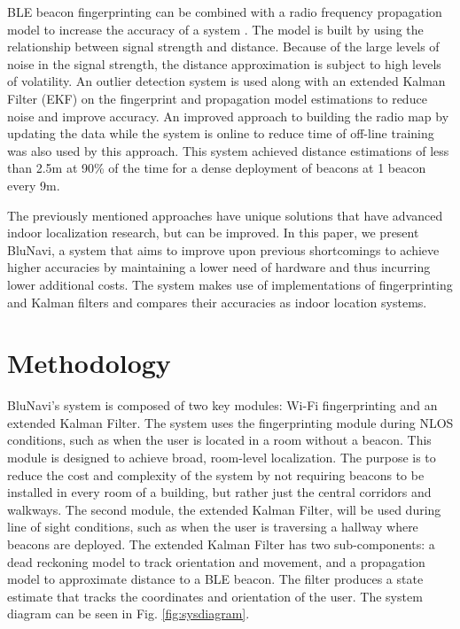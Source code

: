 \documentclass[conference]{IEEEtran}
\begin{document}
BLE beacon fingerprinting can be combined with a radio frequency propagation model to increase the accuracy of a system \cite{zhuang2016smartphone}. The model is built by using the relationship between signal strength and distance. Because of the large levels of noise in the signal strength, the distance approximation is subject to high levels of volatility.  An outlier detection system is used along with an extended Kalman Filter (EKF) on the fingerprint and propagation model estimations to reduce noise and improve accuracy. An improved approach to building the radio map by updating the data while the system is online to reduce time of off-line training was also used by this approach. This system achieved distance estimations of less than 2.5m at 90\% of the time for a dense deployment of beacons at 1 beacon every 9m.

The previously mentioned approaches have unique solutions that have advanced indoor localization research, but can be improved. In this paper, we present BluNavi, a system that aims to improve upon previous shortcomings to achieve higher accuracies by maintaining a lower need of hardware and thus incurring lower additional costs. The system makes use of implementations of fingerprinting and Kalman filters and compares their accuracies as indoor location systems.

\section{Methodology}

BluNavi's system is composed of two key modules: Wi-Fi fingerprinting and an extended Kalman Filter. The system uses the fingerprinting module during NLOS conditions, such as when the user is located in a room without a beacon. This module is designed to achieve broad, room-level localization. The purpose is to reduce the cost and complexity of the system by not requiring beacons to be installed in every room of a building, but rather just the central corridors and walkways. The second module, the extended Kalman Filter, will be used during line of sight conditions, such as when the user is traversing a hallway where beacons are deployed. The extended Kalman Filter has two sub-components: a dead reckoning model to track orientation and movement, and a propagation model to approximate distance to a BLE beacon. The filter produces a state estimate that tracks the coordinates and orientation of the user. The system diagram can be seen in Fig. \ref{fig:sysdiagram}.
\end{document}

